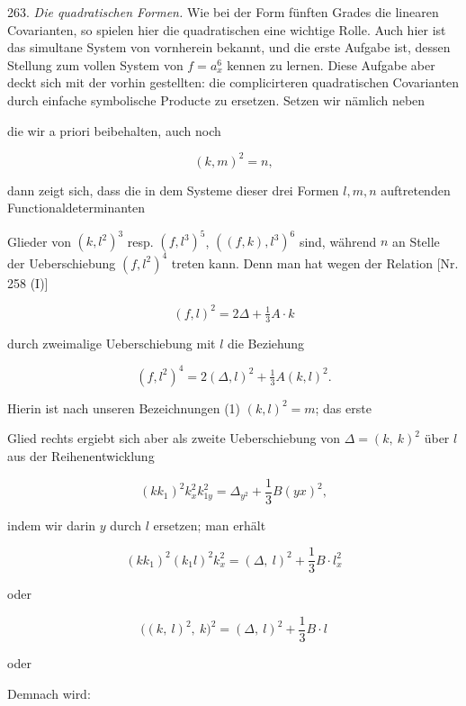 263. \textit{Die quadratischen Formen.} Wie bei der Form fünften
Grades die linearen Covarianten, so spielen hier die quadratischen eine
wichtige Rolle. Auch hier ist das simultane System von vornherein
bekannt, und die erste Aufgabe ist, dessen Stellung zum vollen System
von $f = a_x^6$ kennen zu lernen. Diese Aufgabe aber deckt sich mit der
vorhin gestellten: die complicirteren quadratischen Covarianten durch
einfache symbolische Producte zu ersetzen. Setzen wir nämlich neben


die wir a priori beibehalten, auch noch

\[
(k, m)^2 = n,
\]

dann zeigt sich, dass die in dem Systeme dieser drei Formen $l, m, n$
auftretenden Functionaldeterminanten


Glieder von $(k, l^2)^3$ resp. $(f, l^3)^5$, $((f, k), l^3)^6$ sind, während $n$ an
Stelle der Ueberschiebung $(f, l^2)^4$ treten kann. Denn man hat wegen
der Relation [Nr. 258 (I)]

\[
(f, l)^2 = 2\varDelta + \tfrac{1}{3} A \cdot k
\]

durch zweimalige Ueberschiebung mit $l$ die Beziehung

\[
(f, l^2)^4 = 2(\varDelta, l)^2 + \tfrac{1}{3} A (k, l)^2.
\]

Hierin ist nach unseren Bezeichnungen (1) $(k, l)^2 = m$; das erste



Glied rechts ergiebt sich aber als zweite Ueberschiebung von $\Delta=(k,\ k)^2$
über $l$ aus der Reihenentwicklung

\[
(kk_1)^2 k_x^2 k_{1y}^2 = \Delta_{y^2} + \frac{1}{3} B (yx)^2 ,
\]

indem wir darin $y$ durch $l$ ersetzen; man erhält

\[
(kk_1)^2 (k_1 l)^2 k_x^2 = (\Delta,\ l)^2 + \frac{1}{3} B \cdot l_x^2
\]

oder

\[
\big((k,\ l)^2,\ k\big)^2 = (\Delta,\ l)^2 + \frac{1}{3} B \cdot l
\]

oder

Demnach wird:

